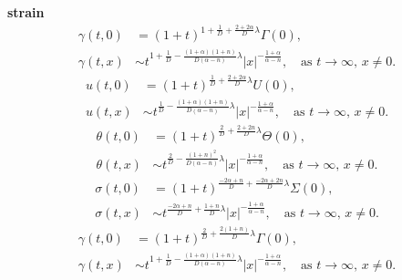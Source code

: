 \documentclass[a4paper,11pt]{article}
\begin{document}
{\bf strain}
\begin{align*}
 \gamma(t,0) &= (1+t)^{1+\frac{1}{D} + \frac{2+2\alpha}{D}\lambda}\Gamma(0),\\
 \gamma(t,x) &\sim t^{1+\frac{1}{D} - \frac{(1+\alpha)(1+n)}{D(\alpha-n)}\lambda}|x|^{-\frac{1+\alpha}{\alpha-n}}, \quad \text{as $t \rightarrow \infty$, $x\ne0$.}
\end{align*}
\begin{align*}
 u(t,0) &= (1+t)^{\frac{1}{D} + \frac{2+2\alpha}{D}\lambda}U(0),\\
 u(t,x) &\sim t^{\frac{1}{D} - \frac{(1+\alpha)(1+n)}{D(\alpha-n)}\lambda}|x|^{-\frac{1+\alpha}{\alpha-n}}, \quad \text{as $t \rightarrow \infty$, $x\ne0$.}
\end{align*}
\begin{align*}
 \theta(t,0) &= (1+t)^{\frac{2}{D} + \frac{2+2n}{D}\lambda}\Theta(0),\\
 \theta(t,x) &\sim t^{\frac{2}{D} - \frac{(1+n)^2}{D(\alpha-n)}\lambda}|x|^{-\frac{1+\alpha}{\alpha-n}}, \quad \text{as $t \rightarrow \infty$, $x\ne0$.}
\end{align*}
\begin{align*}
 \sigma(t,0) &= (1+t)^{\frac{-2\alpha+n}{D} + \frac{-2\alpha+2n}{D}\lambda}\Sigma(0),\\
 \sigma(t,x) &\sim t^{\frac{-2\alpha+n}{D} +\frac{1+n}{D}\lambda}|x|^{-\frac{1+\alpha}{\alpha-n}}, \quad \text{as $t \rightarrow \infty$, $x\ne0$.}
\end{align*}
\begin{align*}
 \gamma(t,0) &= (1+t)^{\frac{2}{D} + \frac{2(1+n)}{D}\lambda}\Gamma(0),\\
 \gamma(t,x) &\sim t^{1+\frac{1}{D} - \frac{(1+\alpha)(1+n)}{D(\alpha-n)}\lambda}|x|^{-\frac{1+\alpha}{\alpha-n}}, \quad \text{as $t \rightarrow \infty$, $x\ne0$.}
\end{align*}
\end{document}
